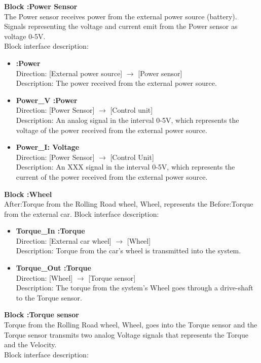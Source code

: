 \textbf{Block :Power Sensor}\\
The Power sensor receives power from the external power source (battery). Signals representing the voltage and current emit from the Power sensor as voltage 0-5V.\\
Block interface description:

\begin{itemize}
	\item \textbf{:Power}\\
		Direction: [External power source] $\rightarrow$ [Power sensor]\\
		Description: The power received from the external power source.
	\item \textbf{Power\_V :Power}\\
		Direction: [Power Sensor] $\rightarrow$ [Control unit]\\
		Description: An analog signal in the interval 0-5V, which represents the voltage of the power received from the external power source.
	\item \textbf{Power\_I: Voltage}\\
		Direction: [Power Sensor] $\rightarrow$ [Control Unit]\\
		Description: An XXX signal in the interval 0-5V, which represents the current of the power received from the external power source.
\end{itemize}

\textbf{Block :Wheel}\\
After:Torque from the Rolling Road wheel, Wheel, represents the Before:Torque from the external car. 
Block interface description:

\begin{itemize}
	\item \textbf{Torque\_In :Torque}\\
		Direction: [External car wheel] $\rightarrow$ [Wheel]\\
		Description: Torque from the car's wheel is transmitted into the system.
	\item \textbf{Torque\_Out :Torque}\\
		Direction: [Wheel] $\rightarrow$ [Torque sensor]\\
		Description: The torque from the system's Wheel goes through a drive-shaft to the Torque sensor.
\end{itemize}

\textbf{Block :Torque sensor}\\
Torque from the Rolling Road wheel, Wheel, goes into the Torque sensor and the Torque sensor transmits two analog Voltage signals that represents the Torque and the Velocity.\\Block interface description:

